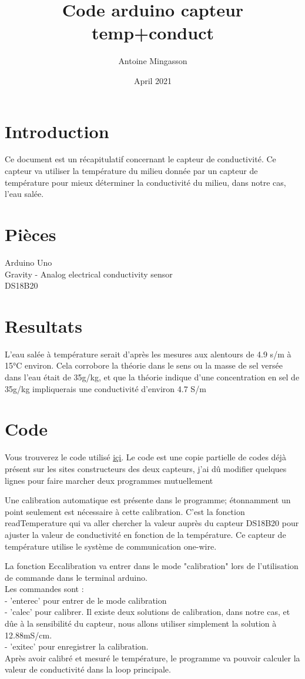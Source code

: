 \documentclass{article}
\title{Code arduino capteur temp+conduct}
\author{Antoine Mingasson}
\date{April 2021}
\begin{document}
\maketitle

\section{Introduction}
Ce document est un récapitulatif concernant le capteur de conductivité. Ce capteur va utiliser la température du milieu donnée par un capteur de température pour mieux déterminer la conductivité du milieu, dans notre cas, l'eau salée.

\section{Pièces}
Arduino Uno\\
Gravity - Analog electrical conductivity sensor\\
DS18B20\\

\section{Resultats}
L'eau salée à température serait d'après les mesures aux alentours de 4.9 s/m à 15°C environ. Cela corrobore la théorie dans le sens ou la masse de sel versée dans l'eau était de 35g/kg, et que la théorie indique d'une concentration en sel de 35g/kg impliquerais une conductivité d'environ 4.7 S/m

\section{Code}
Vous trouverez le code utilisé \href{https://pastebin.com/qUmKfP1h}{\underline{içi}}.
Le code est une copie partielle de codes déjà présent sur les sites constructeurs des deux capteurs, j'ai dû modifier quelques lignes pour faire marcher deux programmes mutuellement

Une calibration automatique est présente dans le programme; étonnamment un point seulement est nécessaire à cette calibration.
C'est la fonction readTemperature qui va aller chercher la valeur auprès du capteur DS18B20 pour ajuster la valeur de conductivité en fonction de la température. Ce capteur de température utilise le système de communication one-wire.

La fonction Eccalibration va entrer dans le mode "calibration" lors de l'utilisation de commande dans le terminal arduino.\\
Les commandes sont :\\
- 'enterec' pour entrer de le mode calibration\\
- 'calec' pour calibrer. Il existe deux solutions de calibration, dans notre cas, et dûe à la sensibilité du capteur, nous allons utiliser simplement la solution à 12.88mS/cm.\\
- 'exitec' pour enregistrer la calibration.\\
Après avoir calibré et mesuré le température, le programme va pouvoir calculer la valeur de conductivité dans la loop principale.
\end{document}

